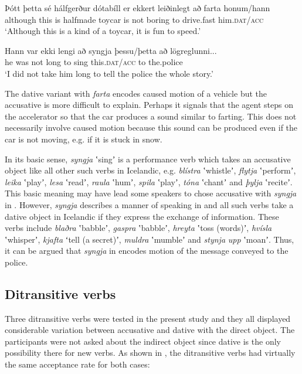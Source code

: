 \documentclass[output=paper,modfonts,nonflat,colorlinks,citecolor=brown]{langsci/langscibook}
\begin{document}
\ea
    \label{ex:jonsson:8}
\ea%
\gll  Þótt  þetta  sé  hálfgerður  dótabíll  er  ekkert  leiðinlegt  að  farta  honum/hann\\
   although  this  is  halfmade  toycar  is  not  boring  to  {drive.fast}  him.\textsc{dat/acc}\\
\glt `Although this is a kind of a toycar, it is fun to speed.'

\ex  \label{ex:jonsson:8b}
\gll   Hann  var  ekki  lengi  að  syngja  þessu/þetta  að  lögreglunni...  \\
 he  was  not  long  to  sing  this.\textsc{dat/acc}  to  the.police  \\
\glt `I did not take him long to tell the police the whole story.'
\z
\z

The dative variant with \textit{farta} encodes caused motion of a vehicle but the accusative is more difficult to explain. Perhaps it signals that the agent steps on the accelerator so that the car produces a sound similar to farting. This does not necessarily involve caused motion because this sound can be produced even if the car is not moving, e.g. if it is stuck in snow.

In its basic sense, \textit{syngja} ʽsingʼ is a performance verb which takes an accusative object like all other such verbs in Icelandic, e.g. \textit{blístra} ʽwhistleʼ, \textit{flytja} ʽperformʼ, \textit{leika} ʽplayʼ, \textit{lesa} ʽreadʼ, \textit{raula} ʽhumʼ, \textit{spila} ʽplayʼ, \textit{tóna} ʽchantʼ and \textit{þylja} ʽreciteʼ. This basic meaning may have lead some speakers to chose accusative with \textit{syngja} in . However, \textit{syngja} describes a manner of speaking in  and all such verbs take a dative object in Icelandic if they express the exchange of information. These verbs include \textit{blaðra} ʽbabbleʼ,  \textit{gaspra} ʽbabbleʼ, \textit{hreyta} ʽtoss (words)ʼ, \textit{hvísla} ʽwhisperʼ, \textit{kjafta} ʻtell (a secret)ʼ, \textit{muldra} ʽmumbleʼ and \textit{stynja} \textit{upp} ʽmoanʼ. Thus, it can be argued that \textit{syngja} in  encodes motion of the message conveyed to the police.

\subsection{Ditransitive verbs} %
\label{sec:jonsson:4.2}

Three ditransitive verbs were tested in the present study and they all displayed considerable variation between accusative and dative with the direct object. The participants were not asked about the indirect object since dative is the only possibility there for new verbs. As shown in , the ditransitive verbs had virtually the same acceptance rate for both cases:
\end{document}
